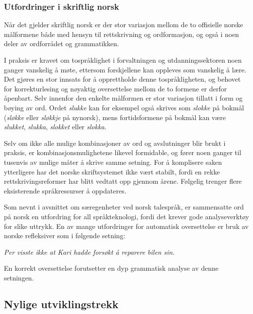 \begin{multicols}{2}
\subsubsection{Utfordringer i skriftlig norsk}

Når det gjelder skriftlig norsk er der stor variasjon mellom de to offisielle norske målformene både med hensyn til rettskrivning og ordformasjon, og også i noen deler av ordforrådet og grammatikken. 

I praksis er kravet om tospråklighet i forvaltningen og utdanningssektoren noen ganger vanskelig å møte, ettersom forskjellene kan oppleves som vanskelig å lære. Det gjøres en stor innsats for å opprettholde denne tospråkligheten, og behovet for korrekturlesing og nøyaktig oversettelse mellom de to formene er derfor åpenbart.
Selv innenfor den enkelte målformen er stor variasjon tillatt i form og bøying av ord. Ordet \textit{slukke} kan for eksempel også skrives som \textit{slokke} på bokmål (\textit{sløkke} eller \textit{sløkkje} på nynorsk), mens fortidsformene på bokmål kan være \textit{slukket}, \textit{slukka}, \textit{slokket} eller \textit{slokka}. 


Selv om ikke alle mulige kombinasjoner av ord og avslutninger blir
brukt i praksis, er kombinasjonsmulighetene likevel formidable, og
fører noen ganger til tusenvis av mulige måter å skrive samme setning.
For å komplisere saken ytterligere har det norske skriftsystemet ikke
vært stabilt, fordi en rekke rettskrivingsreformer har blitt vedtatt
opp gjennom årene. Følgelig trenger flere eksisterende språkressurser
å oppdateres.

Som nevnt i avsnittet om særegenheter ved norsk talespråk, er
sammensatte ord på norsk en utfordring for all språkteknologi, fordi
det krever gode analyseverktøy for slike uttrykk.  En av mange
utfordringer for automatisk oversettelse er bruk av norske refleksiver
som i følgende setning:

\medskip
\emph{Per visste ikke at Kari hadde forsøkt å reparere bilen \emph{sin}.}

\medskip
En korrekt oversettelse forutsetter en dyp grammatisk analyse av denne setningen.

\subsection{Nylige utviklingstrekk}


\end{multicols}
